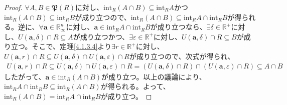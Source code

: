 \documentclass[dvipdfmx]{jsarticle}
\begin{document}
\begin{proof}
$\forall A,B \in \mathfrak{P}(R)$に対し、$\mathrm{int}_{R}(A \cap B) \subseteq \mathrm{int}_{R}A$かつ$\mathrm{int}_{R}(A \cap B) \subseteq \mathrm{int}_{R}B$が成り立つので、$\mathrm{int}_{R}(A \cap B) \subseteq \mathrm{int}_{R}A \cap \mathrm{int}_{R}B$が得られる。逆に、$\forall\mathbf{a} \in \mathbb{R}_{\infty}^{n}$に対し、$\mathbf{a} \in \mathrm{int}_{R}A \cap \mathrm{int}_{R}B$が成り立つなら、$\exists\delta \in \mathbb{R}^{\mathbf{+}}$に対し、$U\left( \mathbf{a},\delta \right) \cap R \subseteq A$が成り立つかつ、$\exists\varepsilon \in \mathbb{R}^{+}$に対し、$U\left( \mathbf{a},\delta \right) \cap R \subseteq B$が成り立つ。そこで、定理\ref{4.1.3.4}より$\exists r \in \mathbb{R}^{+}$に対し、$U\left( \mathbf{a},r \right) \cap R \subseteq U\left( \mathbf{a},\delta \right) \cap U\left( \mathbf{a},\varepsilon \right) \cap R$が成り立つので、次式が得られ、
\begin{align*}
U\left( \mathbf{a},r \right) \cap R \subseteq U\left( \mathbf{a},\delta \right) \cap U\left( \mathbf{a},\varepsilon \right) \cap R = \left( U\left( \mathbf{a},\delta \right) \cap R \right) \cap \left( U\left( \mathbf{a},\varepsilon \right) \cap R \right) \subseteq A \cap B
\end{align*}
したがって、$\mathbf{a} \in \mathrm{int}_{R}(A \cap B)$が成り立つ。以上の議論により、$\mathrm{int}_{R}A \cap \mathrm{int}_{R}B \subseteq \mathrm{int}_{R}(A \cap B)$が得られる。よって、$\mathrm{int}_{R}(A \cap B) = \mathrm{int}_{R}A \cap \mathrm{int}_{R}B$が成り立つ。
\end{proof}
\end{document}
